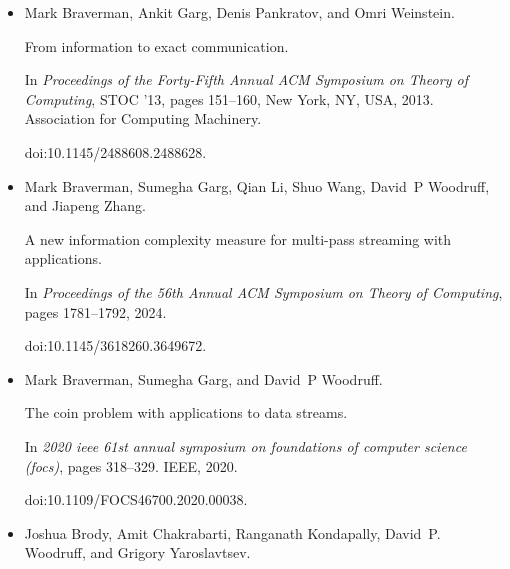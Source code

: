\documentclass[10pt,a4paper]{article}
\begin{document}
\begin{itemize}
Sujoy Bhore, Fabian Klute, and Jelle J Oostveen.


On streaming algorithms for geometric independent set and clique.


In \emph{International Workshop on Approximation and Online
Algorithms}, pages 211–224. Springer, 2022.


doi:10.1007/978-3-031-18367-6\_11.





\item[] 
[11]

Mark Braverman, Ankit Garg, Denis Pankratov, and Omri Weinstein.


From information to exact communication.


In \emph{Proceedings of the Forty-Fifth Annual ACM Symposium on Theory
of Computing}, STOC ’13, pages 151–160, New York, NY, USA, 2013. Association
for Computing Machinery.


doi:10.1145/2488608.2488628.





\item[] 
[12]

Mark Braverman, Sumegha Garg, Qian Li, Shuo Wang, David P Woodruff, and Jiapeng
Zhang.


A new information complexity measure for multi-pass streaming with
applications.


In \emph{Proceedings of the 56th Annual ACM Symposium on Theory of
Computing}, pages 1781–1792, 2024.


doi:10.1145/3618260.3649672.





\item[] 
[13]

Mark Braverman, Sumegha Garg, and David P Woodruff.


The coin problem with applications to data streams.


In \emph{2020 ieee 61st annual symposium on foundations of computer
science (focs)}, pages 318–329. IEEE, 2020.


doi:10.1109/FOCS46700.2020.00038.





\item[] 
[14]

Joshua Brody, Amit Chakrabarti, Ranganath Kondapally, David P. Woodruff, and
Grigory Yaroslavtsev.



\end{itemize}
\end{document}
